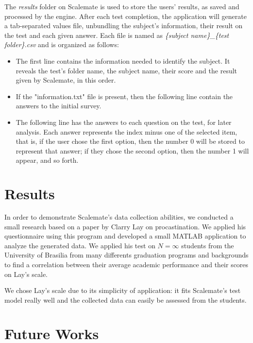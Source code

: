 \documentclass[12pt, a4paper, twoside]{article}
\begin{document}
The \textit{results} folder on Scalemate is used to store the users' results, as saved and processed by the engine. After each test completion, the application will generate a tab-separated values file, unbundling the subject's information, their result on the test and each given answer. Each file is named as \textit{\{subject name\}\_\{test folder\}.csv} and is organized as follows:

\begin{itemize}
\item The first line contains the information needed to identify the subject. It reveals the test's folder name, the subject name, their score and the result given by Scalemate, in this order.
\item If the "information.txt" file is present, then the following line contain the answers to the initial survey.
\item The following line has the answers to each question on the test, for later analysis. Each answer represents the index minus one of the selected item, that is, if the user chose the first option, then the number 0 will be stored to represent that answer; if they chose the second option, then the number 1 will appear, and so forth.
\end{itemize}

\section{Results}

In order to demonstrate Scalemate's data collection abilities, we conducted a small research based on a paper by Clarry Lay \cite{lay86} on procastination. We applied his questionnaire using this program and developed a small MATLAB application to analyze the generated data. We applied his test on $N = \infty$ students from the University of Brasilia from many differents graduation programs and backgrounds to find a correlation between their average academic performance and their scores on Lay's scale.

We chose Lay's scale due to its simplicity of application: it fits Scalemate's test model really well and the collected data can easily be assessed from the students.



\section{Future Works}
\end{document}

